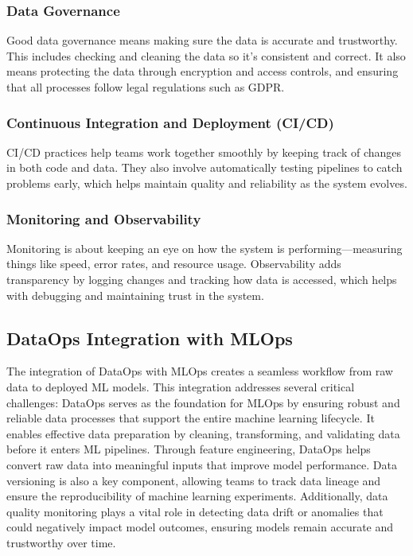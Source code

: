 \subsubsection{Data Governance}
Good data governance means making sure the data is accurate and trustworthy.
This includes checking and cleaning the data so it's consistent and correct.
It also means protecting the data through encryption and access controls,
and ensuring that all processes follow legal regulations such as GDPR.

\subsubsection{Continuous Integration and Deployment (CI/CD)}
CI/CD practices help teams work together smoothly by keeping track of changes in both code and data.
They also involve automatically testing pipelines to catch problems early,
which helps maintain quality and reliability as the system evolves.

\subsubsection{Monitoring and Observability}
Monitoring is about keeping an eye on how the system is performing—measuring things like speed, error rates,
and resource usage.
Observability adds transparency by logging changes and tracking how data is accessed,
which helps with debugging and maintaining trust in the system.

\subsection{DataOps Integration with MLOps}\label{subsec:dataops-mlops-integration}

The integration of DataOps with MLOps creates a seamless workflow from raw data to deployed ML models.
This integration addresses several critical challenges\cite{ad-hoc-dataops}:
DataOps serves as the foundation for MLOps by ensuring robust and reliable data processes that support the entire machine learning lifecycle.
It enables effective data preparation by cleaning, transforming, and validating data before it enters ML pipelines.
Through feature engineering, DataOps helps convert raw data into meaningful inputs that improve model performance.
Data versioning is also a key component, allowing teams to track data lineage and ensure the reproducibility of machine learning experiments.
Additionally, data quality monitoring plays a vital role in detecting data drift or anomalies that could negatively impact model outcomes, ensuring models remain accurate and trustworthy over time.

